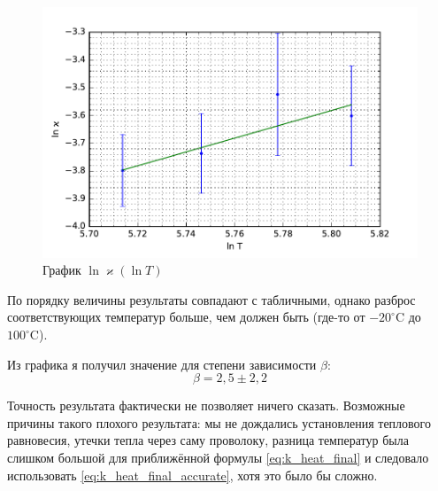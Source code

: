 \documentclass[12pt]{article}
\newcommand{\degC}{^\circ \text{C}}
\begin{document}
	\begin{figure}[!h]
		\caption{График $\ln \varkappa(\ln T)$}
		\label{fig:graph_KT}
		\begin{center}
		 \includegraphics[scale=.8]{graph-KT.pdf}
		\end{center}
	\end{figure}
	
	По порядку величины результаты совпадают с табличными, однако разброс соответствующих температур больше, чем должен быть (где-то от $-20 \degC$ до $100 \degC$).
	
	Из графика я получил значение для степени зависимости $\beta$:
	\begin{equation}
		\label{eq:beta}
		\beta=2{,}5\pm2{,}2 
	\end{equation}
	
	Точность результата фактически не позволяет ничего сказать. Возможные причины такого плохого результата: мы не дождались установления теплового равновесия, утечки тепла через саму проволоку, разница температур была слишком большой для приближённой формулы \eqref{eq:k_heat_final} и следовало использовать \eqref{eq:k_heat_final_accurate}, хотя это было бы сложно.
	
\end{document}
